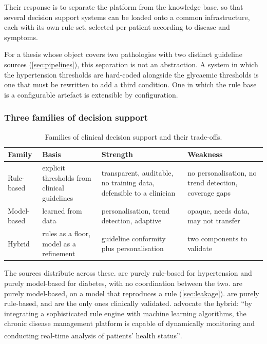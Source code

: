 \documentclass[12pt,a4paper,oneside]{report}
\newcommand{\bq}[1]{``#1''\textsuperscript{\dag}}
\begin{document}
Their response is to separate the platform from the knowledge base, so that several decision support systems can be loaded onto a common infrastructure, each with its own rule set, selected per patient according to disease and symptoms.

For a thesis whose object covers two pathologies with two distinct guideline sources (\cref{sec:pipelines}), this separation is not an abstraction. A system in which the hypertension thresholds are hard-coded alongside the glycaemic thresholds is one that must be rewritten to add a third condition. One in which the rule base is a configurable artefact is extensible by configuration.

\subsubsection{Three families of decision support}

\begin{table}[htbp]
\centering\footnotesize
\caption{Families of clinical decision support and their trade-offs.}\label{tab:cdss-families}
\begin{tabularx}{\textwidth}{@{}>{\raggedright\arraybackslash}p{2.0cm} >{\raggedright\arraybackslash}p{3.2cm} >{\raggedright\arraybackslash}X >{\raggedright\arraybackslash}X@{}}
\toprule
\textbf{Family} & \textbf{Basis} & \textbf{Strength} & \textbf{Weakness} \\
\midrule
Rule-based & explicit thresholds from clinical guidelines & transparent, auditable, no training data, defensible to a clinician & no personalisation, no trend detection, coverage gaps \\
Model-based & learned from data & personalisation, trend detection, adaptive & opaque, needs data, may not transfer \\
Hybrid & rules as a floor, model as a refinement & guideline conformity plus personalisation & two components to validate \\
\bottomrule
\end{tabularx}
\end{table}

The sources distribute across these. \Textcite{chatrati2022} are purely rule-based for hypertension and purely model-based for diabetes, with no coordination between the two. \Textcite{efendi2025} are purely model-based, on a model that reproduces a rule (\cref{sec:leakage}). \Textcite{mihevc2025} are purely rule-based, and are the only ones clinically validated. \Textcite{liu2025review} advocate the hybrid: \bq{by integrating a sophisticated rule engine with machine learning algorithms, the chronic disease management platform is capable of dynamically monitoring and conducting real-time analysis of patients' health status}.
\end{document}
